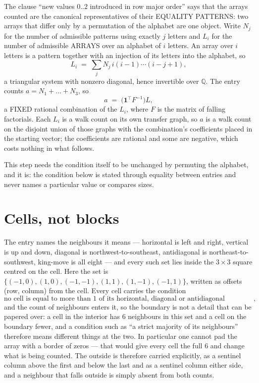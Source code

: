\documentclass[11pt,a4paper]{article}
\theoremstyle{plain}
\theoremstyle{definition}
\begin{document}
The clause ``new values $0..2$ introduced in row major order'' says that the arrays
counted are the canonical representatives of their EQUALITY PATTERNS: two arrays that differ
only by a permutation of the alphabet are one object. Write $N_j$ for the number of admissible
patterns using exactly $j$ letters and $L_i$ for the number of admissible ARRAYS over an
alphabet of $i$ letters. An array over $i$ letters is a pattern together with an injection of
its letters into the alphabet, so
\[
L_i\;=\;\sum_{j}N_j\,i(i-1)\cdots(i-j+1),
\]
a triangular system with nonzero diagonal, hence invertible over $\mathbb{Q}$. The entry
counts $a=N_1+\dots+N_{3}$, so
\[
a\;=\;\bigl(\mathbf{1}^{\!\top}F^{-1}\bigr)L ,
\]
a FIXED rational combination of the $L_i$, where $F$ is the matrix of falling factorials.
Each $L_i$ is a walk count on its own transfer graph, so $a$ is a walk count on the disjoint
union of those graphs with the combination's coefficients placed in the starting vector; the
coefficients are rational and some are negative, which costs nothing in what follows.

This step needs the condition itself to be unchanged by permuting the alphabet, and it is:
the condition below is stated through equality between entries and never names a particular
value or compares sizes.

\section{Cells, not blocks}

The entry names the neighbours it means --- horizontal is left and right, vertical is up and
down, diagonal is northwest-to-southeast, antidiagonal is northeast-to-southwest, king-move is
all eight --- and every such set lies inside the $3\times3$ square centred on the cell. Here
the set is $\{(-1,0), (1,0), (-1,-1), (1,1), (1,-1), (-1,1)\}$, written as offsets (row, column) from the cell. Every cell carries
the condition
\[
\text{no cell is equal to more than 1 of its horizontal, diagonal or antidiagonal neighbours},
\]
and the count of neighbours enters it, so the boundary is not a detail that can be papered
over: a cell in the interior has $6$ neighbours in this set and a cell on the boundary
fewer, and a condition such as ``a strict majority of its neighbours'' therefore means
different things at the two. In particular one cannot pad the array with a border of zeros ---
that would give every cell the full $6$ and change what is being counted. The outside is
therefore carried
explicitly, as a sentinel column above the first and below the last and as a sentinel column
either side, and a neighbour that falls outside is simply absent from both counts.
\end{document}
